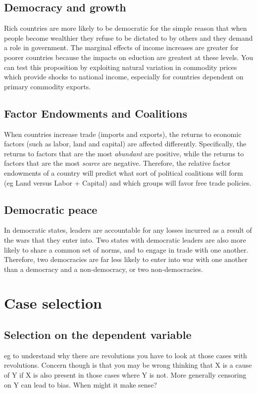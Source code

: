 \documentclass[11pt]{article}
\begin{document}
\subsection{Democracy and growth}
Rich countries are more likely to be democratic for the simple reason that when people become wealthier they refuse to be dictated to by others and they demand a role in government. The marginal effects of income increases are greater for poorer countries because the impacts on eduction are greatest at these levels. You can test this proposition by exploiting natural variation in commodity prices which provide shocks to national income, especially for countries dependent on primary commodity exports.

\subsection{Factor Endowments and Coalitions}
When countries increase trade (imports and exports), the returns to economic factors (such as labor, land and capital) are affected differently. Specifically, the returns to factors that are the most \textit{abundant} are positive, while the returns to factors that are the most \textit{scarce} are  negative. Therefore, the relative factor endowments of a country will predict what sort of political coalitions will form (eg Land versus Labor + Capital) and which groups will favor free trade policies. 

\subsection{Democratic peace}
In democratic states, leaders are accountable for any losses incurred as a result of the wars that they enter into. Two states with democratic leaders are also more likely to share a common set of norms, and to engage in trade with one another. Therefore, two democracies are far less likely to enter into war with one another than a democracy and a non-democracy, or two non-democracies.
\newpage
\section{Case selection}
\subsection{Selection on the dependent variable}
eg to understand why there are revolutions you have to look at those cases with revolutions. Concern though is that you may be wrong thinking that X is a cause of Y if X is also present in those cases where Y is not. More generally censoring on Y can lead to bias. When might it make sense?
\end{document}
